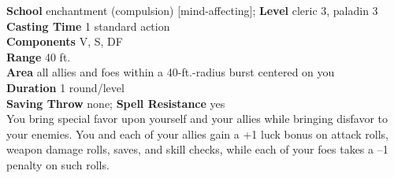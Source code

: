 \textbf{School} enchantment (compulsion) [mind-affecting]; \textbf{Level} cleric 3, paladin 3\\
\textbf{Casting Time} 1 standard action\\
\textbf{Components} V, S, DF\\
\textbf{Range} 40 ft.\\
\textbf{Area} all allies and foes within a 40-ft.-radius burst centered on you\\
\textbf{Duration} 1 round/level\\
\textbf{Saving Throw} none; \textbf{Spell Resistance} yes\\
You bring special favor upon yourself and your allies while bringing disfavor to your enemies. You and each of your allies gain a +1 luck bonus on attack rolls, weapon damage rolls, saves, and skill checks, while each of your foes takes a –1 penalty on such rolls.\\
